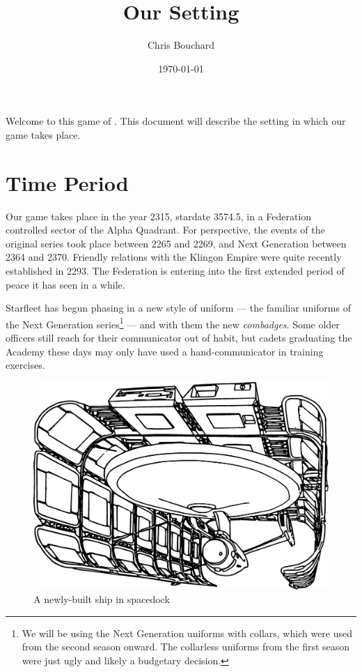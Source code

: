 \documentclass[12pt]{article}
\title{Our \STFLogo{} Setting}
\author{Chris Bouchard}
\date{\mydate\today}
\begin{document}
\maketitle

Welcome to this game of \StarTrekFate{}. This document will describe the
setting in which our game takes place.

\section{Time Period}
Our game takes place in the year 2315, stardate 3574.5, in a Federation
controlled sector of the Alpha Quadrant. For perspective, the events of the
original series took place between 2265 and 2269, and Next Generation between
2364 and 2370. Friendly relations with the Klingon Empire were quite recently
established in 2293. The Federation is entering into the first extended period
of peace it has seen in a while.

Starfleet has begun phasing in a new style of uniform --- the familiar uniforms
of the Next Generation series\footnote{We will be using the Next Generation
uniforms with collars, which were used from the second season onward. The
collarless uniforms from the first season were just ugly and likely a budgetary
decision.} --- and with them the new \emph{combadges}. Some older officers
still reach for their communicator out of habit, but cadets graduating the
Academy these days may only have used a hand-communicator in training
exercises.

\begin{figure}
    \centering
    \includegraphics[width=0.8\linewidth]{img/SpaceDock.eps}\\
    \vspace{2ex}
    \footnotesize A newly-built ship in spacedock
    \vspace{-2em}
\end{figure}
\end{document}
